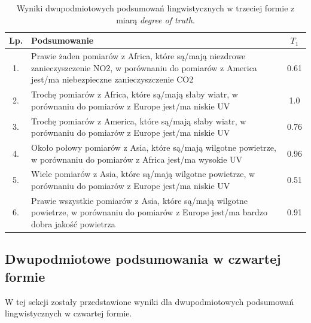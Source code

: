 \documentclass{article}
\begin{document}
\begin{table}[H]
\begin{center}
\normalsize %
\begin{tabular}{|c|p{10cm}|c|} %
\hline
\textbf{Lp.} & \textbf{Podsumowanie} & \textbf{\(T_1\)} \\ \hline
1. & Prawie żaden pomiarów z Africa, które są/mają niezdrowe zanieczyszczenie NO2, w porównaniu do pomiarów z America jest/ma niebezpieczne zanieczyszczenie CO2 & 0.61 \\\hline
2. & Trochę pomiarów z Africa, które są/mają słaby wiatr, w porównaniu do pomiarów z Europe jest/ma niskie UV & 1.0 \\\hline
3. & Trochę pomiarów z America, które są/mają słaby wiatr, w porównaniu do pomiarów z Europe jest/ma niskie UV & 0.76 \\\hline
4. & Około połowy pomiarów z Asia, które są/mają wilgotne powietrze, w porównaniu do pomiarów z Africa jest/ma wysokie UV & 0.96 \\\hline
5. & Wiele pomiarów z Asia, które są/mają wilgotne powietrze, w porównaniu do pomiarów z Europe jest/ma niskie UV & 0.51 \\\hline
6. & Prawie wszystkie pomiarów z Asia, które są/mają wilgotne powietrze, w porównaniu do pomiarów z Europe jest/ma bardzo dobra jakość powietrza & 0.91 \\\hline
\end{tabular}
\caption{Wyniki dwupodmiotowych podsumowań lingwistycznych w trzeciej formie z miarą \textit{degree of truth}.}
\end{center}
\end{table}

\subsection{Dwupodmiotowe podsumowania w czwartej formie}
W tej sekcji zostały przedstawione wyniki dla dwupodmiotowych podsumowań lingwistycznych w czwartej formie.
\end{document}

